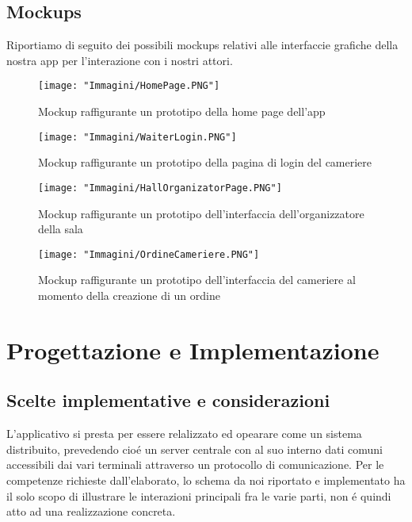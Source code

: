 \documentclass{article}
\begin{document}
\subsection{Mockups}
Riportiamo di seguito dei possibili mockups relativi alle interfaccie grafiche della nostra app per l'interazione con i nostri attori.

\begin{figure}[!h]
\centering
\texttt{[image: "Immagini/HomePage.PNG"]}
\caption{Mockup raffigurante un prototipo della home page dell'app}
\end{figure}

\newpage

\begin{figure}[!h]
\centering
\texttt{[image: "Immagini/WaiterLogin.PNG"]}
\caption{Mockup raffigurante un prototipo della pagina di login del cameriere}
\end{figure}

\begin{figure}[!h]
\centering
\texttt{[image: "Immagini/HallOrganizatorPage.PNG"]}
\caption{Mockup raffigurante un prototipo dell'interfaccia dell'organizzatore della sala}
\end{figure}

\newpage

\begin{figure}[!h]
\centering
\texttt{[image: "Immagini/OrdineCameriere.PNG"]}
\caption{Mockup raffigurante un prototipo dell'interfaccia del cameriere al momento della creazione di un ordine}
\end{figure}

\section{Progettazione e Implementazione}
\subsection{Scelte implementative e considerazioni}
L'applicativo si presta per essere relalizzato ed opearare come un sistema distribuito, prevedendo cio\'e un server centrale con al suo interno dati comuni accessibili dai vari terminali attraverso un protocollo di comunicazione. Per le competenze richieste dall'elaborato, lo schema da noi riportato e implementato ha il solo scopo di illustrare le interazioni principali fra le varie parti, non \'e quindi atto ad una realizzazione concreta.  
\end{document}
